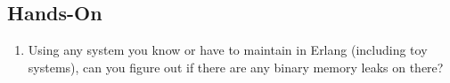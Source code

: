 \documentclass[11pt, oneside]{book}   	%
\begin{document}
\subsection*{Hands-On}

\begin{enumerate}
	\item Using any system you know or have to maintain in Erlang (including toy systems), can you figure out if there are any binary memory leaks on there?
\end{enumerate}
	

\end{document}
